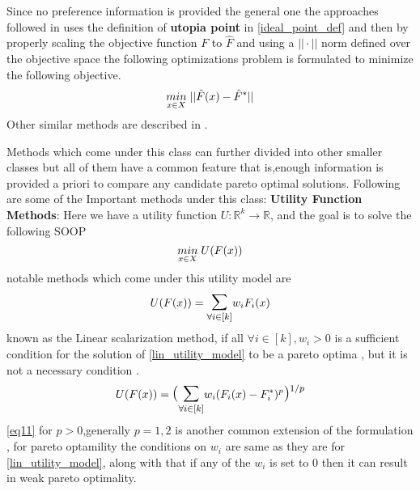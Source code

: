 Since no preference information is provided the general one the approaches followed in \cite{zeleny1973compromise} uses the definition of \textbf{utopia point} in \ref{ideal_point_def} and then by properly scaling the objective function $F$ to $\hat{F}$ and using a $||\cdot||$ norm defined over the objective space the following optimizations problem is formulated to minimize the following objective.
\begin{equation}
    \underset{x \in X}{min}\hspace{1mm} ||\hat{F}(x) - \hat{F}^{*}||
\end{equation}
\newline Other similar methods are described in \cite{miettinen1998}.

Methods which come under this class can further divided into other smaller classes but all of them have a common feature that is,enough information is provided a priori to compare any candidate pareto optimal solutions.
\newline Following are some of the Important methods under this class:
\newline \newline \textbf{Utility Function Methods}: Here we have a utility function $U: \mathbb{R}^k \to \mathbb{R}$, and the goal is to solve the following SOOP
\begin{equation}
    \underset{x \in X}{min}\hspace{1mm} U(F(x))
\end{equation}
\newline notable methods which come under this utility model are
\begin{equation} \label{lin_utility_model}
    U(F(x)) = \mathlarger{\mathlarger{\sum}}_{\forall i\in [k]} w_i F_i(x)
\end{equation}
\newline known as the Linear scalarization method, if all $\forall i \in [k], w_i > 0$ is a sufficient condition for the solution of \ref{lin_utility_model} to be a pareto optima \cite{zadeh1963optimality}, but it is not a necessary condition \cite{zionts1989multiple}.
\begin{equation} \label{eq11}
    U(F(x)) = \mathlarger{\mathlarger{( \sum}}_{\forall i\in [k]} w_i (F_i(x)-F^{*}_i)^p \mathlarger{\mathlarger{) }}^{1/p}
\end{equation}
\newline \ref{eq11} for $p>0$,generally $p=1,2$ is another common extension of the formulation \cite{yu1976compromise}, for pareto optamility the conditions on $w_i$ are same as they are for \ref{lin_utility_model}, along with that if any of the $w_i$ is set to $0$ then it can result in weak pareto optimality.
